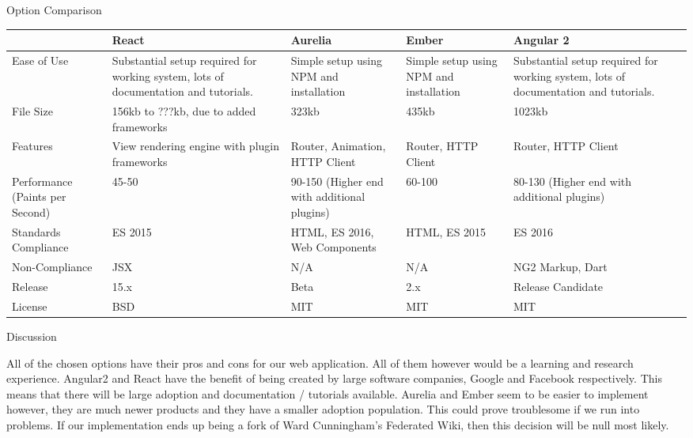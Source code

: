 \documentclass[letterpaper, 10pt, draftclsnofoot, compsoc, onecolumn]{IEEEtran}
\begin{document}
{{ \par}


\newpage
{\noindent Option Comparison \par}
\tablehead{}
\begin{supertabular}{|p{2cm}|p{2.5cm}|p{2.5cm}|p{2.5cm}|p{2.5cm}|}
\hline \cite{Eisenberg} & React \cite{React} & Aurelia \cite{Aurelia} & Ember \cite{Ember} & Angular 2 \cite{Angular2}\\ \hline
Ease of Use & Substantial setup required for working system, lots of documentation and tutorials. & Simple setup using NPM and installation     & Simple setup using NPM and installation & Substantial setup required for working system, lots of documentation and tutorials. \\ \hline
File Size & 156kb to ???kb, due to added frameworks & 323kb & 435kb                                   & 1023kb \\ \hline
Features & View rendering engine with plugin frameworks & Router, Animation, HTTP Client & Router, HTTP Client & Router, HTTP Client                                                                 \\ \hline
Performance (Paints per Second) & 45-50 & 90-150 (Higher end with additional plugins) & 60-100 & 80-130 (Higher end with additional plugins) \\ \hline
Standards Compliance & ES 2015 & HTML, ES 2016, Web Components & HTML, ES 2015                           & ES 2016\\ \hline
Non-Compliance & JSX                                                                                 & N/A & N/A & NG2 Markup, Dart \\ \hline
Release & 15.x & Beta & 2.x  & Release Candidate \\ \hline
License & BSD & MIT & MIT & MIT \\ \hline
\end{supertabular}

\newpage
{\noindent Discussion \par}
{\noindent All of the chosen options have their pros and cons for our web application. All of them however would be a learning and research experience. Angular2 and React have the benefit of being created by large software companies, Google and Facebook respectively. This means that there will be large adoption and documentation / tutorials available. Aurelia and Ember seem to be easier to implement however, they are much newer products and they have a smaller adoption population. This could prove troublesome if we run into problems. If our implementation ends up being a fork of Ward Cunningham's Federated Wiki, then this decision will be null most likely. \par}

}
\end{document}

